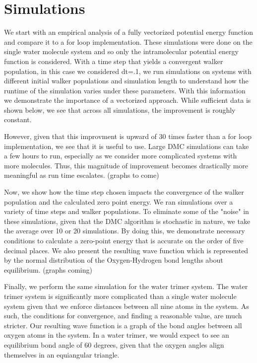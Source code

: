 \documentclass[journal=jacsat,manuscript=article]{achemso}
\begin{document}
\section{Simulations}
We start with an empirical analysis of a fully vectorized potential energy function and compare it to a for loop implementation. These simulations were done on the single water molecule system and so only the intramolecular potential energy function is considered. With a time step that yields a convergent walker population, in this case we considered dt=.1, we run simulations on systems with different initial walker populations and simulation length to understand how the runtime of the simulation varies under these parameters. With this information we demonstrate the importance of a vectorized approach. While sufficient data is shown below, we see that across all simulations, the improvement is roughly constant.

However, given that this improvment is upward of 30 times faster than a for loop implementation, we see that it is useful to use. Large DMC simulations can take a few hours to run, especially as we consider more complicated systems with more molecules. Thus, this magnitude of improvement becomes drastically more meaningful as run time escalates. (graphs to come)

Now, we show how the time step chosen impacts the convergence of the walker population and the calculated zero point energy. We ran simulations over a variety of time steps and walker populations. To eliminate some of the "noise" in these simulations, given that the DMC algorithm is stochastic in nature, we take the average over 10 or 20 simulations. By doing this, we demonstrate necessary conditions to calculate a zero-point energy that is accurate on the order of five decimal places. We also present the resulting wave function which is represented by the normal distribution of the Oxygen-Hydrogen bond lengths about equilibrium. (graphs coming)

Finally, we perform the same simulation for the water trimer system. The water trimer system is significantly more complicated than a single water molecule system given that we enforce distances between all nine atoms in the system. As such, the conditions for convergence, and finding a reasonable value, are much stricter. Our resulting wave function is a graph of the bond angles between all oxygen atoms in the system. In a water trimer, we would expect to see an equilibrium bond angle of 60 degrees, given that the oxygen angles align themselves in an equiangular triangle. 
\end{document}
